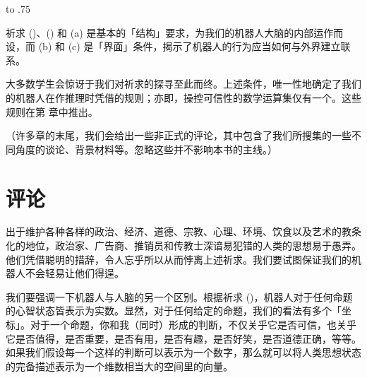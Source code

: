 \placeformula[desiderata-3c]
\startformula
{}\quad\quad\hbox to .75
\stopformula
\stopsubformulas

祈求 ()、() 和 (a) 是基本的「结构」要求，为我们的机器人大脑的内部运作而设，而 (b) 和 (c) 是「界面」条件，揭示了机器人的行为应当如何与外界建立联系。

大多数学生会惊讶于我们对祈求的探寻至此而终。上述条件，唯一性地确定了我们的机器人在作推理时凭借的规则；亦即，操控可信性的数学运算集仅有一个。这些规则在第  章中推出。

（许多章的末尾，我们会给出一些非正式的评论，其中包含了我们所搜集的一些不同角度的谈论、背景材料等。忽略这些并不影响本书的主线。）

\section{评论}

出于维护各种各样的政治、经济、道德、宗教、心理、环境、饮食以及艺术的教条化的地位，政治家、广告商、推销员和传教士深谙易犯错的人类的思想易于愚弄。他们凭借聪明的措辞，令人忘乎所以从而悖离上述祈求。我们要试图保证我们的机器人不会轻易让他们得逞。

我们要强调一下机器人与人脑的另一个区别。根据祈求 ()，机器人对于任何命题的心智状态皆表示为实数。显然，对于任何给定的命题，我们的看法有多个「坐标」。对于一个命题，你和我（同时）形成的判断，不仅关乎它是否可信，也关乎它是否值得，是否重要，是否有用，是否有趣，是否好笑，是否道德正确，等等。如果我们假设每一个这样的判断可以表示为一个数字，那么就可以将人类思想状态的完备描述表示为一个维数相当大的空间里的向量。